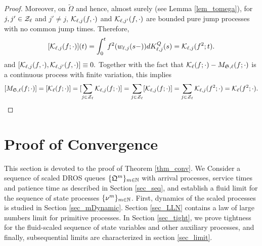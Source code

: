 \documentclass{article}
\theoremstyle{definition}
\numberwithin{equation}{section}
\begin{document}
\begin{proof}
Moreover, on $\tilde\Omega$ and hence, almost surely (see Lemma \ref{lem_tomega}), for $j,j'\in\mathcal{Z}_\ell$  and $j'\neq j$, $\mathcal{K}_{\ell,j}(f,\cdot)$ and $\mathcal{K}_{\ell,j'}(f,\cdot)$ are bounded pure jump processes with no common jump times. Therefore,
\[
[\mathcal{K}_{\ell,j}(f;\cdot)](t) = \int_{0}^{t} f^2(w_{\ell,j}(s-))dK^Q_{\ell,j}(s) = \mathcal{K}_{\ell,j}(f^2;t).
\]
and $[ \mathcal{K}_{\ell,j}(f,\cdot),\mathcal{K}_{\ell,j'}(f,\cdot)] \equiv 0.$  Together with the fact that $\mathcal{K}_{\ell}(f;\cdot)-M_{\mathfrak{S},\ell}(f;\cdot)$ is a continuous process with finite variation, this implies
\[ [M_{\mathfrak{S},\ell}(f;\cdot)] = [\mathcal{K}_{\ell}(f;\cdot)] = [\sum_{j\in\mathcal{Z}_\ell}\mathcal{K}_{\ell,j}(f;\cdot)] = \sum_{j\in\mathcal{Z}_\ell}[\mathcal{K}_{\ell,j}(f;\cdot)] =\sum_{j\in\mathcal{Z}_\ell}\mathcal{K}_{\ell,j}(f^2;\cdot)=\mathcal{K}_{\ell}(f^2;\cdot). \]
\end{proof}












\section{Proof of Convergence}\label{sec_convproof}

This section is devoted to the proof of Theorem \ref{thm_conv}. We Consider a sequence of scaled DROS queues $\{\mathfrak{Q}^m\}_{m\in\mathbb{N}}$ with arrival processes, service times and patience time as described in Section \ref{sec_seq}, and establish a fluid limit for the sequence of state processes $\{\nu^m\}_{m\in\mathbb{N}}$. First, dynamics of the scaled processes is studied in Section \ref{sec_mDynamic}.  Section \ref{sec_LLN} contains a law of large numbers limit for primitive processes. In Section \ref{sec_tight}, we prove tightness for the fluid-scaled sequence of state variables and other auxiliary processes, and finally, subsequential limits are characterized in section \ref{sec_limit}.
\end{document}
